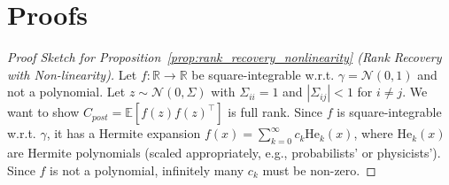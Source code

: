 \documentclass{article}
\newcommand{\R}{\mathbb{R}}
\newcommand{\E}{\mathbb{E}}
\newcommand{\He}{\mathrm{He}}
\begin{document}

\appendix

\section{Proofs}
\label{app:proofs}

\begin{proof}[Proof Sketch for Proposition~\ref{prop:rank_recovery_nonlinearity} (Rank Recovery with Non-linearity)]
Let $f:\R\to\R$ be square-integrable w.r.t. $\gamma = \mathcal{N}(0,1)$ and not a polynomial. Let $z \sim \mathcal{N}(0, \Sigma)$ with $\Sigma_{ii}=1$ and $|\Sigma_{ij}| < 1$ for $i \neq j$. We want to show $C_{post} = \E[f(z)f(z)^\top]$ is full rank.
Since $f$ is square-integrable w.r.t. $\gamma$, it has a Hermite expansion $f(x) = \sum_{k=0}^{\infty} c_k \He_k(x)$, where $\He_k(x)$ are Hermite polynomials (scaled appropriately, e.g., probabilists' or physicists'). Since $f$ is not a polynomial, infinitely many $c_k$ must be non-zero.


\end{proof}
\end{document}
